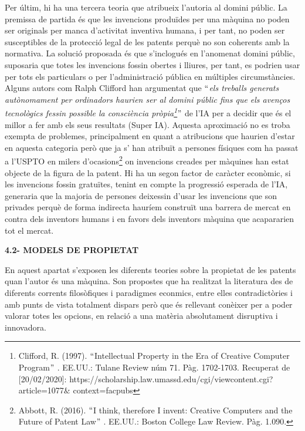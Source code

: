 \documentclass[12pt]{article}
\renewcommand{\_}{\kern-1.5pt\textunderscore\kern-1.5pt}
\begin{document}
\begin{itemize}
\vspace{\baselineskip}
Per últim, hi ha una tercera teoria que atribueix l’autoria al domini públic. La premissa de partida és que les invencions produïdes per una màquina no poden ser originals per manca d’activitat inventiva humana, i per tant, no poden ser susceptibles de la protecció legal de les patents perquè no son coherents amb la normativa. La solució proposada és que s’inclogués en l’anomenat domini públic, suposaria que totes les invencions fossin obertes i lliures, per tant, es podrien usar per tots els particulars o per l’administració pública en múltiples circumstàncies. Alguns autors com Ralph Clifford han argumentat que $``$\textit{els treballs generats autònomament per ordinadors haurien ser al domini públic fins que els avenços tecnològics fessin possible la consciència pròpia\footnote{ Clifford, R. (1997). $``$Intellectual Property in the Era of Creative Computer Program$"$ . EE.UU.: Tulane Review núm 71. Pàg. 1702-1703. Recuperat de [20/02/2020]: https://scholarship.law.umassd.edu/cgi/viewcontent.cgi?article=1077$\&$ context=fac\_pubs }$"$  }de l’IA per a decidir que és el millor a fer amb els seus resultats (Super IA). Aquesta aproximació no es troba exempta de problemes, principalment en quant a atribucions que haurien d’estar en aquesta categoria però que ja s’ han atribuït  a persones físiques com ha passat a l’USPTO en milers d’ocasions\footnote{Abbott, R. (2016). $``$I think, therefore I invent: Creative Computers and the Future of Patent Law$"$ . EE.UU.: Boston College Law Review. Pàg. 1.090. } on invencions creades per màquines han estat objecte de la figura de la patent. Hi ha un segon factor de caràcter econòmic, si les invencions fossin gratuïtes, tenint en compte la progressió esperada de l’IA, generaria que la majoria de persones deixessin d’usar les invencions que son privades perquè de forma indirecta hauríem construït una barrera de mercat en contra dels inventors humans i en favors dels inventors màquina que acapararien tot el mercat.\par


\vspace{\baselineskip}

\vspace{\baselineskip}
\textbf{4.2- MODELS DE PROPIETAT}\par


\vspace{\baselineskip}
\begin{justify}
En aquest apartat s’exposen les diferents teories sobre la propietat de les patents quan l’autor és una màquina. Son propostes que ha realitzat la literatura des de diferents corrents filosòfiques i paradigmes econmics, entre elles contradictòries i amb punts de vista totalment dispars però que és rellevant conèixer per a poder valorar totes les opcions,  en relació a una matèria absolutament disruptiva i innovadora. 
\end{justify}\par



\end{itemize}
\end{document}
